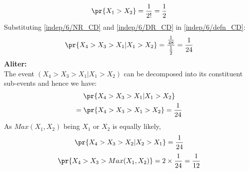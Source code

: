 \begin{enumerate}
\begin{multline}
\end{multline}
\begin{align}
    \pr{X_1>X_2} = \frac{1}{2!} = \frac{1}{2} \label{indep/6/DR_CD}
\end{align}
Substituting \eqref{indep/6/NR_CD} and \eqref{indep/6/DR_CD} in \eqref{indep/6/defn_CD}:
\begin{align}
    \pr{X_4 > X_3 > X_1 | X_1 > X_2 } = \dfrac{\frac{1}{48}}{\frac{1}{2}} = \frac{1}{24}
\end{align}
\textbf{Aliter:}\\
The event $(X_4 > X_3 > X_1 | X_1 > X_2)$ can be decomposed into its constituent sub-events and hence we have:
\begin{multline}
    \pr{X_4 > X_3 > X_1|X_1>X_2} \\= \pr{X_4 > X_3 > X_1 > X_2} = \frac{1}{24}
\end{multline}
As $Max(X_1,X_2)$ being $X_1$ or $X_2$ is equally likely,
\begin{align}
\pr{X_4 > X_3 > X_2| X_2 > X_1} = \frac{1}{24}
\end{align}
\begin{align}
    \pr{X_4 > X_3 > Max(X_1,X_2)} = 2 \times \frac{1}{24} = \frac{1}{12}
\end{align}
\end{enumerate}